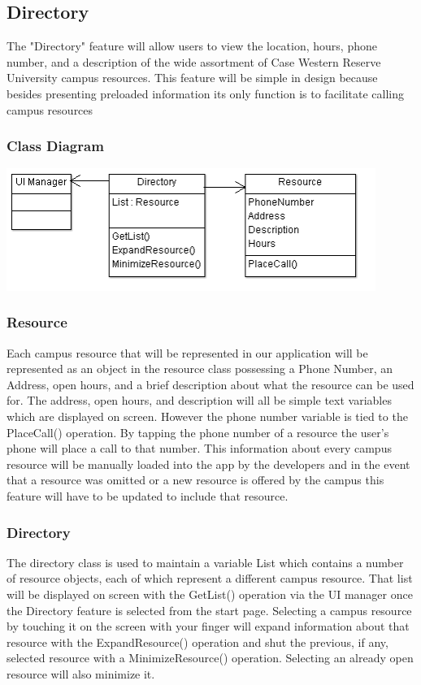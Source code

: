 \documentclass[pdftex,12pt,letter]{article}
\begin{document}
\subsection{Directory}
The "Directory" feature will allow users to view the location, hours, phone number, and a description of the wide assortment of Case Western Reserve University campus resources. This feature will be simple in design because besides presenting preloaded information its only function is to facilitate calling campus resources 
\subsubsection{Class Diagram}
\begin{flushleft}
\includegraphics[width=120mm]{DirectoryCD.png}
\end{flushleft}
\subsubsection{Resource}
Each campus resource that will be represented in our application will be represented as an object in the resource class possessing a Phone Number, an Address, open hours, and a brief description about what the resource can be used for. The address, open hours, and description will all be simple text variables which are displayed on screen. However the phone number variable is tied to the PlaceCall() operation. By tapping the phone number of a resource the user’s phone will place a call to that number. This information about every campus resource will be manually loaded into the app by the developers and in the event that a resource was omitted or a new resource is offered by the campus this feature will have to be updated to include that resource. 
\subsubsection{Directory}
The directory class is used to maintain a variable List which contains a number of resource objects, each of which represent a different campus resource. That list will be displayed on screen with the GetList() operation via the UI manager once the Directory feature is selected from the start page. Selecting a campus resource by touching it on the screen with your finger will expand information about that resource with the ExpandResource() operation and shut the previous, if any, selected resource with a MinimizeResource() operation. Selecting an already open resource will also minimize it.
\end{document}
